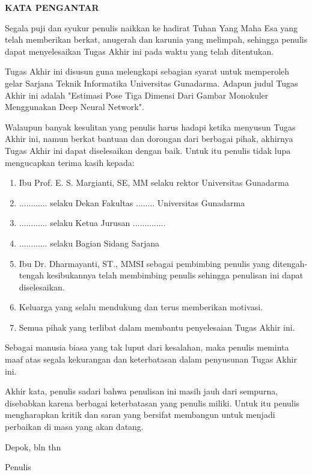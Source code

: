 \newpage %
\begin{center}
\begin{large}\textbf{KATA PENGANTAR}\\\end{large}
\end{center}
\vspace{5mm}


Segala puji dan syukur penulis naikkan ke hadirat Tuhan Yang Maha Esa yang telah memberikan berkat, 
anugerah dan karunia yang melimpah, sehingga penulis dapat menyelesaikan Tugas Akhir ini pada waktu 
yang telah ditentukan.

Tugas Akhir ini disusun guna melengkapi sebagian syarat untuk memperoleh gelar Sarjana Teknik 
Informatika Universitas Gunadarma. Adapun judul Tugas Akhir ini adalah "Estimasi Pose Tiga Dimensi
Dari Gambar Monokuler Menggunakan Deep Neural Network".

Walaupun banyak kesulitan yang penulis harus hadapi ketika menyusun Tugas Akhir ini, namun berkat 
bantuan dan dorongan dari berbagai pihak, akhirnya Tugas Akhir ini dapat diselesaikan dengan baik. 
Untuk itu penulis tidak lupa mengucapkan terima kasih kepada:

\begin{enumerate}
  \item Ibu Prof. E. S. Margianti, SE, MM selaku rektor Universitas Gunadarma
  \item ............ selaku Dekan Fakultas ........ Universitas Gunadarma
  \item ............ selaku Ketua Jurusan ..............
  \item ............ selaku Bagian Sidang Sarjana
  \item Ibu Dr. Dharmayanti, ST., MMSI sebagai pembimbing penulis yang ditengah-tengah kesibukannya 
  telah membimbing penulis sehingga penulisan ini dapat diselesaikan.
  \item Keluarga yang selalu mendukung dan terus memberikan motivasi.
  \item Semua pihak yang terlibat dalam membantu penyelesaian Tugas Akhir ini.

\end{enumerate}

Sebagai manusia biasa yang tak luput dari kesalahan, maka penulis meminta maaf atas segala 
kekurangan dan keterbatasan dalam penyusunan Tugas Akhir ini.

Akhir kata, penulis sadari bahwa penulisan ini masih jauh dari sempurna, disebabkan karena berbagai 
keterbatasan yang penulis miliki. Untuk itu penulis mengharapkan kritik dan saran yang bersifat 
membangun untuk menjadi perbaikan di masa yang akan datang.


\vspace{0.5 cm}
\begin{flushright}
Depok, bln thn

\vspace{1.5 cm}
Penulis
\end{flushright}